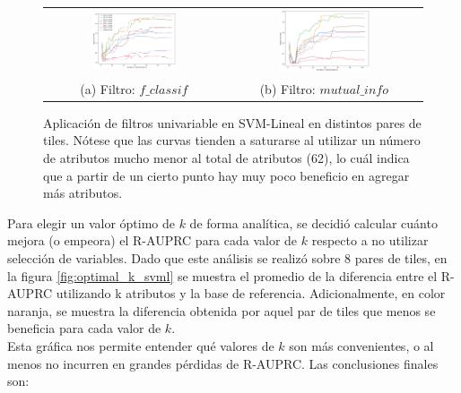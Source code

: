 \begin{figure}[h!]
\begin{tabular}{cc}
  \includegraphics[width=0.49\textwidth]{Kap5/linear_f_classif_ALL_CURVES.png} &   \includegraphics[width=0.49\textwidth]{Kap5/linear_mutual_info_classif_ALL_CURVES.png} \\
(a) Filtro: $f\_classif$ & (b) Filtro: $mutual\_info$
\end{tabular}
\caption{Aplicación de filtros univariable en SVM-Lineal en distintos pares de tiles. Nótese que las curvas tienden a saturarse al utilizar un número de atributos mucho menor al total de atributos (62), lo cuál indica que a partir de un cierto punto hay muy poco beneficio en agregar más atributos. }
\label{fig:svml_univariate_unified}
\end{figure}

Para elegir un valor óptimo de $k$ de forma analítica, se decidió calcular cuánto mejora (o empeora) el R-AUPRC para cada valor de $k$ respecto a no utilizar selección de variables. Dado que este análisis se realizó sobre 8 pares de tiles, en la figura \ref{fig:optimal_k_svml} se muestra el promedio de la diferencia entre el R-AUPRC utilizando k atributos y la base de referencia. Adicionalmente, en color naranja, se muestra la diferencia obtenida por aquel par de tiles que menos se beneficia para cada valor de $k$. \\

Esta gráfica nos permite entender qué valores de $k$ son más convenientes, o al menos no incurren en grandes pérdidas de R-AUPRC. Las conclusiones finales son:

